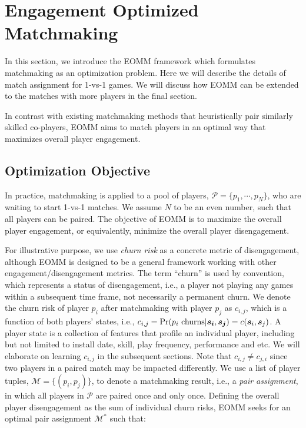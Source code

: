 \section{Engagement Optimized Matchmaking}\label{sec:optimization}
In this section, we introduce the EOMM framework which formulates matchmaking as an optimization problem. Here we will describe the details of match assignment for 1-vs-1 games. We will discuss how EOMM can be extended to the matches with more players in the final section.

In contrast with existing matchmaking methods that heuristically pair similarly skilled co-players, EOMM aims to match players in an optimal way that maximizes overall player engagement. 

\subsection{Optimization Objective}
In practice, matchmaking is applied to a pool of players, $\mathcal{P}=\{p_1, \cdots, p_N\}$, who are waiting to start 1-vs-1 matches. We assume $N$ to be an even number, such that all players can be paired. The objective of EOMM is to maximize the overall player engagement, or equivalently, minimize the overall player disengagement. 

For illustrative purpose, we use \emph{churn risk} as a concrete metric of disengagement, although EOMM is designed to be a general framework working with other engagement/disengagement metrics. The term ``churn'' is used by convention, which represents a status of disengagement, i.e., a player not playing any games within a subsequent time frame, not necessarily a permanent churn. We denote the churn risk of player $p_i$ after matchmaking with player $p_j$ as $c_{i,j}$, which is a function of both players' states, i.e., $c_{i,j}=\Pr(p_i \text{ churns} | \boldsymbol{s_i}, \boldsymbol{s_j})=c(\boldsymbol{s}_i, \boldsymbol{s}_j)$. A player state is a collection of features that profile an individual player, including but not limited to install date, skill, play frequency, performance and etc. We will elaborate on learning $c_{i,j}$ in the subsequent sections. Note that $c_{i,j}\neq c_{j,i}$ since two players in a paired match may be impacted differently. We use a list of player tuples, $\mathcal{M}=\{(p_i,p_j)\}$, to denote a matchmaking result, i.e., a \textit{pair assignment}, in which all players in $\mathcal{P}$ are paired once and only once. Defining the overall player disengagement as the sum of individual churn risks, EOMM seeks for an optimal pair assignment $\mathcal{M}^*$ such that:

